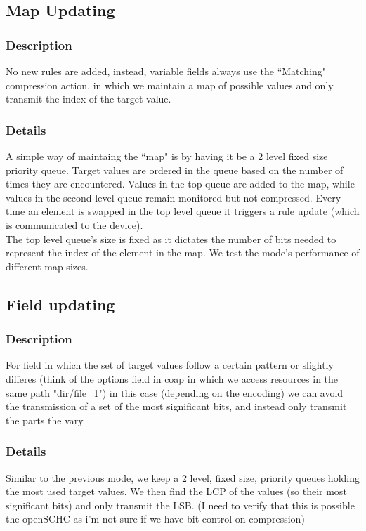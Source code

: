 \documentclass{article}
\numberwithin{equation}{subsection}
\begin{document}
	\newpage
	\subsection{Map Updating}
	\subsubsection{Description}
	\par{
		No new rules are added, instead, variable fields always use the ``Matching" compression
		action, in which we maintain a map of possible values and only transmit the index of the target value.
	}

	\subsubsection{Details}
	\par{
		A simple way of maintaing the ``map" is by having it be a 2 level fixed size priority queue.
		Target values are ordered in the queue based on the number of times they are encountered. Values
		in the top queue are added to the map, while values in the second level queue remain monitored but not compressed.
		Every time an element is swapped in the top level queue it triggers a rule update (which is communicated to the device).\\
		The top level queue's size is fixed as it dictates the number of bits needed to represent the index of the element in the
		map. We test the mode's performance of different map sizes.
	}

	\vspace{20pt}
	\subsection{Field updating}
	\subsubsection{Description}
	\par{
		For field in which the set of target values follow a certain pattern or slightly
		differes (think of the options field in coap in which we access resources in the same path "dir/file\_1") in this case
		(depending on the encoding) we can avoid the transmission of a set of the most significant bits, and instead only
		transmit the parts the vary.
	}

	\subsubsection{Details}
	\par{
		Similar to the previous mode, we keep a 2 level, fixed size, priority queues holding the most
		used target values. We then find the LCP of the values (so their most significant bits) and only transmit the 
		LSB. (I need to verify that this is possible the openSCHC as i'm not sure if we have bit control on compression)
	}
\end{document}
